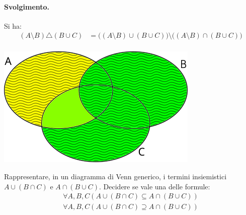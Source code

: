 \paragraph{Svolgimento.} Si ha:
\begin{align*}
	(A \setminus B) \triangle (B \cup C) &= \bigl((A \setminus B)  \cup (B \cup C)\bigr) \setminus \bigl((A \setminus B) \cap (B \cup C)\bigr) \\
\end{align*}
\begin{center}
	\includegraphics[scale=.6]{res/Venn_Esercizio3.png}
\end{center}
\hfill \blacksquare
\begin{exsbox}
	Rappresentare, in un diagramma di Venn generico, i termini insiemistici $A \cup (B \cap C)$ e $A \cap (B \cup C)$. Decidere se vale una delle formule:
	\begin{eqnarray}
		\forall A,B,C (A \cup (B \cap C) \subseteq A \cap (B \cup C))  \\
		\forall A,B,C (A \cup (B \cap C) \supseteq A \cap (B \cup C))
	\end{eqnarray}
\end{exsbox}
